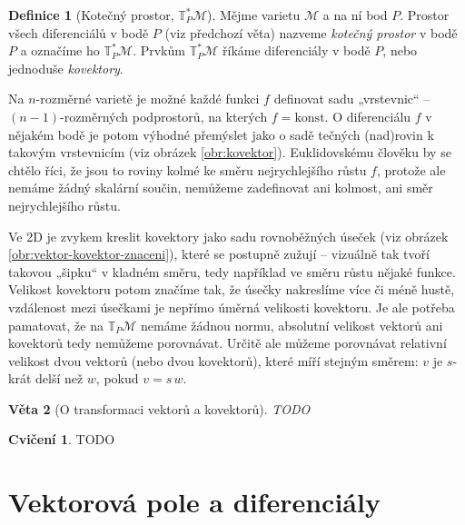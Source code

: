 \documentclass{article}
\newtheorem{theorem}{Věta}[section]
\theoremstyle{definition}
\newtheorem{definition}[theorem]{Definice}
\newtheorem*{exercise}{Cvičení}
\newcommand{\const}[1]{\mathrm{#1}}
\newcommand{\konst}{\const{konst.}}
\def\Manif{\mathcal{M}}
\def\Tang{\mathbb{T}}
\begin{document}
\begin{definition}[Kotečný prostor, $\Tang^*_P\Manif$]
    Mějme varietu $\Manif$ a na ní bod $P$. Prostor všech diferenciálů v bodě $P$ (viz předchozí věta) nazveme \textit{kotečný prostor} v bodě $P$ a označíme ho $\Tang^*_P\Manif$. Prvkům $\Tang^*_P\Manif$ říkáme diferenciály v bodě $P$, nebo jednoduše \textit{kovektory}.
\end{definition}

Na $n$-rozměrné varietě je možné každé funkci $f$ definovat sadu „vrstevnic“ – $(n-1)$-rozměrných podprostorů, na kterých $f=\konst$ O diferenciálu $f$ v nějakém bodě je potom výhodné přemýslet jako o sadě tečných (nad)rovin k takovým vrstevnicím (viz obrázek \ref{obr:kovektor}). Euklidovskému člověku by se chtělo říci, že jsou to roviny kolmé ke směru nejrychlejšího růstu $f$, protože ale nemáme žádný skalární součin, nemůžeme zadefinovat ani kolmost, ani směr nejrychlejšího růstu.

Ve 2D je zvykem kreslit kovektory jako sadu rovnoběžných úseček (viz obrázek \ref{obr:vektor-kovektor-znaceni}), které se postupně zužují – vizuálně tak tvoří takovou „šipku“ v kladném směru, tedy například ve směru růstu nějaké funkce. Velikost kovektoru potom značíme tak, že úsečky nakreslíme více či méně hustě, vzdálenost mezi úsečkami je nepřímo úměrná velikosti kovektoru. Je ale potřeba pamatovat, že na $\Tang_P\Manif$ nemáme žádnou normu, absolutní velikost vektorů ani kovektorů tedy nemůžeme porovnávat. Určitě ale můžeme porovnávat relativní velikost dvou vektorů (nebo dvou kovektorů), které míří stejným směrem: $v$ je $s$-krát delší než $w$, pokud $v=s\,w$.

\begin{theorem}[O transformaci vektorů a kovektorů]
TODO
\end{theorem}

\begin{exercise}
TODO
\end{exercise}

\section{Vektorová pole a diferenciály}
\end{document}
